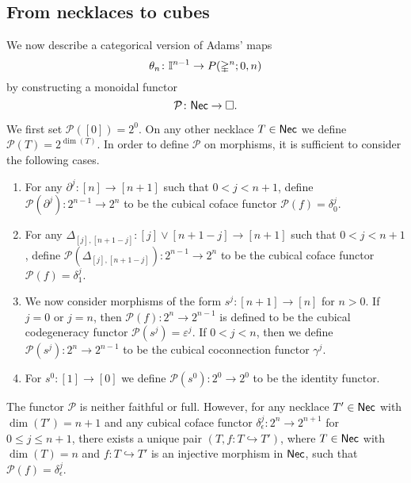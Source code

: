 \subsection{From necklaces to cubes}

We now describe a categorical version of Adams' maps
\begin{equation*}
\theta_n \colon \mathbb{I}^{n-1} \to P(\mathbb{\Delta}^{n};0,n)
\end{equation*}
by constructing a monoidal functor
\begin{equation*}
\mathcal{P} \colon \mathsf{Nec} \to \square.
\end{equation*}

We first set $\mathcal{P}([0])=2^0$.
On any other necklace $T \in \mathsf{Nec}$ we define $\mathcal{P}( T )= 2^{\dim(T)}$.
In order to define $\mathcal{P}$ on morphisms, it is sufficient to consider the following cases.
\begin{enumerate}
	\item For any $\partial^j \colon [n] \to [n+1]$ such that $0< j<{n+1}$, define $\mathcal{P}(\partial^j) \colon 2^{n-1}\to 2^{n}$ to be the cubical coface functor $\mathcal{P}(f)= \delta_0^{j}.$ 
	
	\item For any $\Delta_{[j], [n+1-j]} \colon [j] \vee [n+1-j] \to [n+1]$ such that $0<j<n+1$, define $\mathcal{P}(\Delta_{[j], [n+1-j]}) \colon 2^{n-1}\to 2^{n}$ to be the cubical coface functor $\mathcal{P}(f)=\delta_1^{j}$.
	
	\item We now consider morphisms of the form $s^j \colon [n+1] \to [n]$ for $n>0$.
	If $j=0$ or $j=n$, then $\mathcal{P}(f) \colon 2^n \to 2^{n-1}$ is defined to be the cubical codegeneracy functor $\mathcal{P}(s^j)= \varepsilon^{j}.$ If $0<j<n$, then we define $\mathcal{P}(s^j) \colon 2^n \to 2^{n-1}$ to be the cubical coconnection functor $\gamma^{j}.$
	
	\item For $s^0 \colon [1] \to [0]$ we define $\mathcal{P}(s^0) \colon 2^0 \to 2^0$ to be the identity functor.
\end{enumerate}

\begin{remark}
	The functor $\mathcal{P}$ is neither faithful or full.
	However, for any necklace $T' \in \mathsf{Nec}$ with $\dim(T')=n+1$ and any cubical coface functor $\delta_{\epsilon}^j \colon 2^n \to 2^{n+1}$ for $0 \leq j \leq n+1$, there exists a unique pair $(T, f \colon T \hookrightarrow T')$, where $T \in \mathsf{Nec}$ with $\dim(T)=n$ and $f \colon T \hookrightarrow T'$ is an injective morphism in $\mathsf{Nec}$, such that $\mathcal{P}(f) = \delta_{\epsilon}^j $.
\end{remark}

